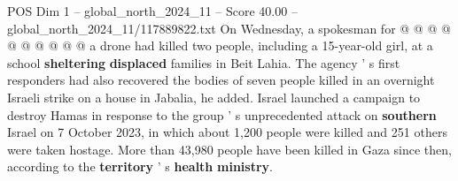 \begin{textsample}{POS Dim 1 – global\_north\_2024\_11 – Score 40.00 – global\_north\_2024\_11/117889822.txt}
On Wednesday, a spokesman for @ @ @ @ @ @ @ @ @ @ a drone had killed two people, including a 15-year-old girl, at a school \textbf{sheltering} \textbf{displaced} families in Beit Lahia.
The agency ' s first responders had also recovered the bodies of seven people killed in an overnight Israeli strike on a house in Jabalia, he added.
Israel launched a campaign to destroy Hamas in response to the group ' s unprecedented attack on \textbf{southern} Israel on 7 October 2023, in which about 1,200 people were killed and 251 others were taken hostage.
More than 43,980 people have been killed in Gaza since then, according to the \textbf{territory} ' s \textbf{health} \textbf{ministry}.

\end{textsample}
